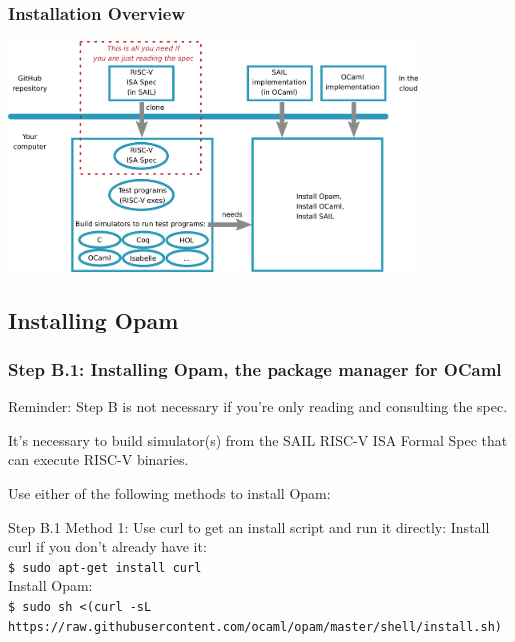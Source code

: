 \documentclass[aspectratio=169]{beamer}
\newcommand{\hm}{\hspace*{1em}}
\newcommand{\scripttt}{\scriptsize\tt}
\begin{document}
\begin{frame}
  \frametitle{Installation Overview}

  \centering
  \includegraphics[height=2.4in]{Figures/Fig_Installation_Overview.png}
\end{frame}



\subsection{Installing Opam}

\begin{frame}
  \frametitle{Step B.1: Installing Opam, the package manager for OCaml}

  Reminder: Step B is not necessary if you're only reading and
  consulting the spec.

  It's necessary to build simulator(s) from the SAIL RISC-V ISA Formal
  Spec that can execute RISC-V binaries.

  \vspace*{2ex}

  Use either of the following methods to install Opam:

  \begin{block}{Step B.1 Method 1: Use curl to get an install script and run it directly:}
    Install curl if you don't already have it: \\
    {\scripttt\hm{}\$ sudo apt-get install curl} \\
    Install Opam: \\
    {\scripttt\hm{}\$ sudo sh <(curl -sL https://raw.githubusercontent.com/ocaml/opam/master/shell/install.sh)}
  \end{block}
\end{frame}
\end{document}
